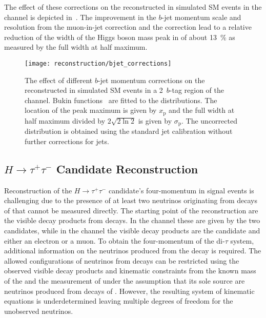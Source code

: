 The effect of these corrections on the reconstructed \mBB in simulated SM \HH
events in the \hadhad channel is depicted
in~. The improvement in the $b$-jet momentum
scale and resolution from the muon-in-jet correction and the \pTreco correction
lead to a relative reduction of the width of the Higgs boson mass peak in \mBB
of about \SI{13}{\percent} as measured by the full width at half maximum.

\begin{figure}[htbp]
  \centering

  \texttt{[image: reconstruction/bjet\_corrections]}

  \caption{The effect of different $b$-jet momentum corrections on the
    reconstructed \mBB in simulated SM \HH events in a 2~$b$-tag region of the
    \hadhad channel. Bukin functions~\cite{Bukin:2007zha} are fitted to the \mBB
    distributions. The location of the peak maximum is given by $x_{\text{p}}$
    and the full width at half maximum divided by $2\sqrt{2 \ln 2}$ is given by
    $\sigma_{\text{p}}$. The uncorrected distribution is obtained using the
    standard jet calibration without further corrections for \btagged jets.}%
  \label{fig:bjet_momentum_corr_mbb}
\end{figure}


\subsection{$H \to \tau^{+}\tau^{-}$ Candidate Reconstruction}%
\label{sec:htautau_reco}

Reconstruction of the $H \to \tau^{+}\tau^{-}$ candidate's four-momentum in
signal events is challenging due to the presence of at least two neutrinos
originating from decays of \tauleptons that cannot be measured directly. The
starting point of the reconstruction are the visible decay products from
\taulepton decays. In the \hadhad channel these are given by the two \tauhadvis
candidates, while in the \lephad channel the visible decay products are the
\tauhadvis candidate and either an electron or a muon. To obtain the
four-momentum of the di-$\tau$ system, %
additional information on the neutrinos produced from the \taulepton decay is
required. The allowed configurations of neutrinos from \taulepton decays can be
restricted using the observed visible decay products and kinematic constraints
from the known mass of the \taulepton and the measurement of \pTmiss under the
assumption that its sole source are neutrinos produced from decays of
\tauleptons. However, the resulting system of kinematic equations is
underdetermined leaving multiple degrees of freedom for the unobserved
neutrinos.

